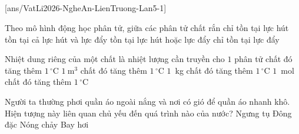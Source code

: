 \def\CheDo{solcolor}%
\def\tenchuong{Liên trường Nghệ An -- Lần 5}
\def\thuonghieu{VẬT LÍ 12 -- Eduzy.com.vn}
\def\TachCauDS{1}
\def\TachCauLG{1}




	\noindent
	\subsection*{}
	\setcounter{ex}{0}
	[ans/VatLi2026-NgheAn-LienTruong-Lan5-1]

	\begin{ex}%
		Theo mô hình động học phân tử, giữa các phân tử chất rắn
		\choice
		{chỉ tồn tại lực hút}
		{\True tồn tại cả lực hút và lực đẩy}
		{tồn tại lực hút hoặc lực đẩy}
		{chỉ tồn tại lực đẩy}
	\end{ex}

	\begin{ex}%
		Nhiệt dung riêng của một chất là nhiệt lượng cần truyền cho
		\choice
		{$1$ phân tử chất đó tăng thêm $1\,^\circ\text{C}$}
		{$1~\text{m}^3$ chất đó tăng thêm $1\,^\circ\text{C}$}
		{\True $1$~kg chất đó tăng thêm $1\,^\circ\text{C}$}
		{$1$~mol chất đó tăng thêm $1\,^\circ\text{C}$}
	\end{ex}

	\begin{ex}%
		Người ta thường phơi quần áo ngoài nắng và nơi có gió để quần áo nhanh khô. Hiện tượng này liên quan chủ yếu đến quá trình nào của nước?
		\choice
		{Ngưng tụ}
		{Đông đặc}
		{Nóng chảy}
		{\True Bay hơi}
	\end{ex}

